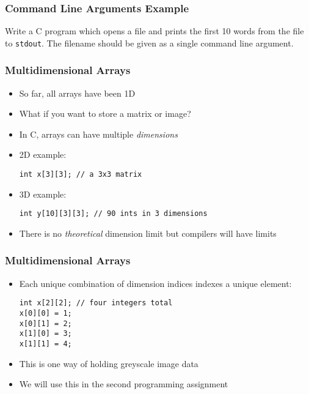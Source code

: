 \documentclass[14pt]{beamer}
\begin{document}
\begin{frame}
\frametitle{Command Line Arguments Example}
Write a C program which opens a file and prints the first 10 words from the file to \texttt{stdout}. The filename should be given as a single command line argument.
\end{frame}

\begin{frame}[fragile]
\frametitle{Multidimensional Arrays}
\begin{itemize}
\item So far, all arrays have been 1D
\item What if you want to store a matrix or image?
\pause
\item In C, arrays can have multiple \textit{dimensions}
\item 2D example:
\begin{lstlisting}[style=CStyle]
int x[3][3]; // a 3x3 matrix
\end{lstlisting}
\item 3D example:
\begin{lstlisting}[style=CStyle]
int y[10][3][3]; // 90 ints in 3 dimensions
\end{lstlisting}
\item There is no \textit{theoretical} dimension limit but compilers will have limits
\end{itemize}
\end{frame}

\begin{frame}[fragile]
\frametitle{Multidimensional Arrays}
\begin{itemize}
\item Each unique combination of dimension indices indexes a unique element:
\begin{lstlisting}[style=CStyle]
int x[2][2]; // four integers total
x[0][0] = 1;
x[0][1] = 2;
x[1][0] = 3;
x[1][1] = 4;
\end{lstlisting}
\item This is one way of holding greyscale image data
\item We will use this in the second programming assignment
\end{itemize}
\end{frame}
\end{document}
